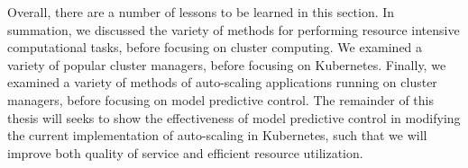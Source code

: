Overall, there are a number of lessons to be learned in this section. In
summation, we discussed the variety of methods for performing resource intensive
computational tasks, before focusing on cluster computing. We examined a variety
of popular cluster managers, before focusing on Kubernetes. Finally, we examined
a variety of methods of auto-scaling applications running on cluster managers,
before focusing on model predictive control. The remainder of this thesis will
seeks to show the effectiveness of model predictive control in modifying the
current implementation of auto-scaling in Kubernetes, such that we will improve
both quality of service and efficient resource utilization.


